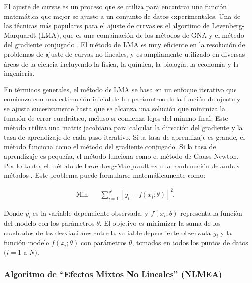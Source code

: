El ajuste de curvas es un proceso que se utiliza para encontrar una función matemática que mejor se ajuste a un conjunto de datos experimentales. Una de las técnicas más populares para el ajuste de curvas es el algortimo de Levenberg-Marquardt (LMA), que es una combinación de los métodos de GNA y el método del gradiente conjugado \cite{levenberduke}. El método de LMA es muy eficiente en la resolución de problemas de ajuste de curvas no lineales, y es ampliamente utilizado en diversas áreas de la ciencia incluyendo la física, la química, la biología, la economía y la ingeniería.


En términos generales, el método de LMA se basa en un enfoque iterativo que comienza con una estimación inicial de los parámetros de la función de ajuste y se ajusta sucesivamente hasta que se alcanza una solución que minimiza la función de error cuadrático, incluso si comienza lejos del mínimo final. Este método utiliza una matriz jacobiana para calcular la dirección del gradiente y la tasa de aprendizaje de cada paso iterativo. Si la tasa de aprendizaje es grande, el método funciona como el método del gradiente conjugado. Si la tasa de aprendizaje es pequeña, el método funciona como el método de Gauss-Newton. Por lo tanto, el método de Levenberg-Marquardt es una combinación de ambos métodos \cite{levenberduke}. Este problema puede formularse matemáticamente como:

\begin{align}
\text{Min} \quad & \sum_{i=1}^{N} [y_i - f(x_i; \theta)]^2,
\end{align}

Donde $y_i$ es la variable dependiente observada, y $f(x_i; \theta)$ representa la función del modelo con los parámetros $\theta$. El objetivo es minimizar la suma de los cuadrados de las desviaciones entre la variable dependiente observada $y_i$ y la función modelo $f(x_i; \theta)$ con parámetros $\theta$, tomados en todos los puntos de datos ($i = 1$ a $N$).

\subsubsection{Algoritmo de ``Efectos Mixtos No Lineales'' (NLMEA)}\label{NLMEAlabel}

